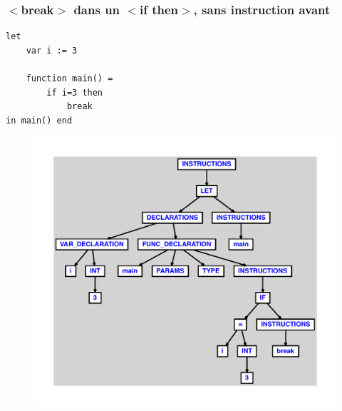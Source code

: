 \documentclass{article}
\begin{document}
\subsubsection{$ < $break$ > $ dans un $ < $if then$ > $, sans instruction avant}
\begin{lstlisting}
let
	var i := 3

	function main() =
		if i=3 then
			break
in main() end
\end{lstlisting}
\newpage
\begin{figure}[H]
\centering
\includegraphics[max width=\textwidth]{ast/ast_17.pdf}
\end{figure}
\newpage
\end{document}

